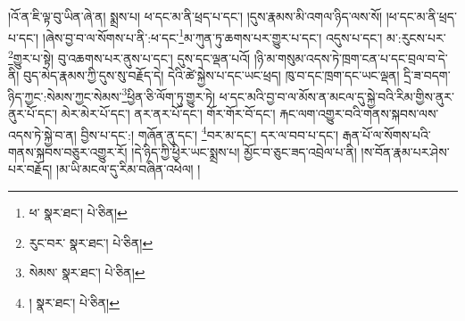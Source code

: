 །འོ་ན་ཇི་ལྟ་བུ་ཡིན་ཞེ་ན། སྨྲས་པ། ཕ་དང་མ་ནི་ཕྲད་པ་དང་། །དུས་རྣམས་མི་འགལ་ཉིད་ལས་སོ། །ཕ་དང་མ་ནི་ཕྲད་པ་དང་། །ཞེས་བྱ་བ་ལ་སོགས་པ་ནི་:ཕ་དང་\footnote{ཕ་  སྣར་ཐང་།  པེ་ཅིན། }མ་ཀུན་ཏུ་ཆགས་པར་གྱུར་པ་དང་། འདུས་པ་དང་། མ་:རུངས་པར་\footnote{རུང་བར་  སྣར་ཐང་།  པེ་ཅིན། }གྱུར་པ་སྟེ། བུ་འཆགས་པར་ནུས་པ་དང་། དུས་དང་ལྡན་པའོ། །ཉི་མ་གསུམ་འདས་ཏེ་ཁྲག་ངན་པ་དང་བྲལ་བ་དེ་ནི། བུད་མེད་རྣམས་ཀྱི་དུས་སུ་བརྗོད་དེ། དེའི་ཚེ་སྐྱེས་པ་དང་ཡང་ཕྲད། ཁུ་བ་དང་ཁྲག་དང་ཡང་ལྡན། དྲི་ཟ་བདག་ཉིད་ཀྱང་:སེམས་ཀྱང་སེམས་\footnote{སེམས་  སྣར་ཐང་།  པེ་ཅིན། }ཕྱིན་ཅི་ལོག་ཏུ་གྱུར་ཏེ། ཕ་དང་མའི་བྱ་བ་ལ་མོས་ན་མངལ་དུ་སྐྱེ་བའི་རིམ་གྱིས་ནུར་ནུར་པོ་དང་། མེར་མེར་པོ་དང་། ནར་ནར་པོ་དང་། གོར་གོར་བོ་དང་། རྐང་ལག་འགྱུར་བའི་གནས་སྐབས་ལས་འདས་ཏེ་སྐྱེ་བ་ན། བྱིས་པ་དང་:། གཞོན་ནུ་དང་། \footnote{།    སྣར་ཐང་།  པེ་ཅིན། }བར་མ་དང་། དར་ལ་བབ་པ་དང་། རྒན་པོ་ལ་སོགས་པའི་གནས་སྐབས་བཅུར་འགྱུར་རོ། །དེ་ཉིད་ཀྱི་ཕྱིར་ཡང་སྨྲས་པ། མྱོང་བ་ཅུང་ཟད་འབྲེལ་པ་ནི། །ས་བོན་རྣམ་པར་ཤེས་པར་བརྗོད། །མ་ཡི་མངལ་དུ་རིམ་བཞིན་འཕེལ། །
